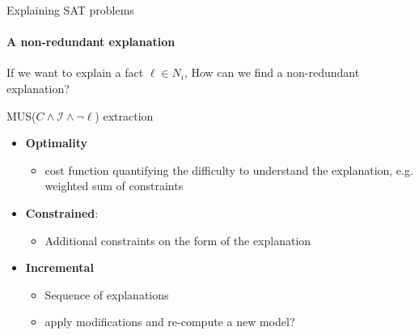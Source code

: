 \documentclass{beamer}
\newcommand\m[1]{\ensuremath{#1}\xspace}
\newcommand\formulac{\ensuremath{\m{C} }\xspace}
\begin{document}
	\begin{frame}{Explaining SAT problems}
		\framesubtitle{A non-redundant explanation}
		 If we want to explain a fact $\ell \in N_i$, How can we find a non-redundant explanation? 
\begin{center}
	MUS($\formulac \land \mathcal{I} \land \neg \ell $) extraction 
\end{center}\pause
\begin{itemize}
	\item \textbf{Optimality}
	\begin{itemize}
		\item cost function quantifying the difficulty to understand the explanation, e.g. weighted sum of constraints
	\end{itemize}\pause
	\item \textbf{Constrained}:
	\begin{itemize}
		\item Additional constraints on the form of the explanation
	\end{itemize}\pause
	 \item \textbf{Incremental}
	 \begin{itemize}
	 	\item Sequence of explanations
	 	\item apply modifications and re-compute a new model?
	 \end{itemize}
\end{itemize}
\end{frame}


	
%		
%		
\end{document}
